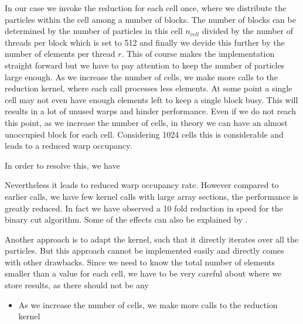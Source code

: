 \documentclass[]{article}
\begin{document}
In our case we invoke the reduction for each cell once, where we distribute the particles within the cell among a number of blocks. The number of blocks can be determined by the number of particles in this cell $n_{cell}$ divided by the number of threads per block which is set to 512 and finally we devide this further by the number of elements per thread $r$. This of course makes the implementation straight forward but we have to pay attention to keep the number of particles large enough. As we increase the number of cells, we make more calls to the reduction kernel, where each call processes less elements. At some point a single cell may not even have enough elements left to keep a single block busy. This will results in a lot of unused warps and hinder performance. Even if we do not reach this point, as we increase the number of cells, in theory we can have an almost unoccupied block for each cell. Considering 1024 cells this is considerable and leads to a reduced warp occupancy. 

In order to resolve this, we have 

  Nevertheless it leads to reduced warp occupancy rate. However compared to earlier calls, we have few kernel calls with large array sections, the performance is greatly reduced. In fact we have observed a 10 fold reduction in speed for the binary cut algorithm. Some of the effects can also be explained by  .

Another approach is to adapt the kernel, such that it directly iterates over all the particles. But this approach cannot be implemented easily and directly comes with other drawbacks. Since we need to know the total number of elements smaller than a value for each cell, we have to be very careful about where we store results, as there should not be any 

\begin{itemize}
	\item As we increase the number of cells, we make more calls to the reduction kernel 
	
\end{itemize}
\end{document}
